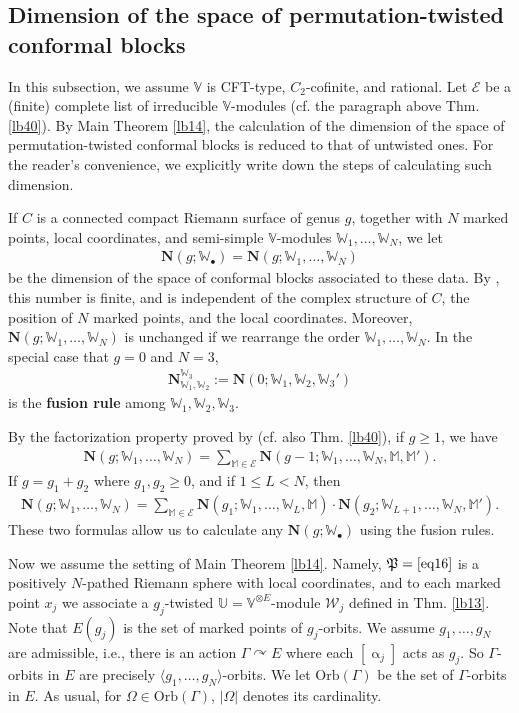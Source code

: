 \documentclass[12pt,a4paper,notitlepage]{article}
\theoremstyle{definition}
\theoremstyle{plain}
\newcommand{\fk}{\mathfrak}
\newcommand{\mc}{\mathcal}
\newcommand{\bk}[1]{\langle {#1}\rangle}
\newcommand{\blt}{\bullet}
\newcommand{\Vbb}{\mathbb V}
\newcommand{\Ubb}{\mathbb U}
\newcommand{\Wbb}{\mathbb W}
\newcommand{\Mbb}{\mathbb M}
\newcommand{\Nbf}{\mathbf N}
\newcommand{\Orb}{\mathrm{Orb}}
\numberwithin{equation}{subsection}
\begin{document}
\begin{subappendices}
\subsection{Dimension of the space of permutation-twisted conformal blocks}\label{lb58}

In this subsection, we assume $\Vbb$ is CFT-type, $C_2$-cofinite, and rational. Let $\mc E$ be a (finite) complete list of irreducible $\Vbb$-modules (cf. the paragraph above Thm. \ref{lb40}). By Main Theorem \ref{lb14}, the calculation of the dimension of the space of permutation-twisted conformal blocks is reduced to that of untwisted ones. For the reader's convenience, we explicitly write down the steps of calculating such dimension.



If $C$ is a connected compact Riemann surface of genus $g$, together with $N$ marked points, local coordinates, and semi-simple  $\Vbb$-modules $\Wbb_1,\dots,\Wbb_N$, we let
\begin{align*}
\Nbf(g;\Wbb_\blt)=\Nbf(g;\Wbb_1,\dots,\Wbb_N)	 
\end{align*}
be the dimension of the space of conformal blocks associated to these data. By \cite{DGT19a,DGT19b}, this number is finite, and  is independent of the complex structure of $C$, the position of $N$ marked points, and the local coordinates. Moreover, $\Nbf(g;\Wbb_1,\dots,\Wbb_N)$ is unchanged if we rearrange the order $\Wbb_1,\dots,\Wbb_N$. In the special case that $g=0$ and $N=3$,
\begin{align*}
\Nbf_{\Wbb_1,\Wbb_2}^{\Wbb_3}:=\Nbf(0;\Wbb_1,\Wbb_2,\Wbb_3')	
\end{align*}
is the \textbf{fusion rule} among $\Wbb_1,\Wbb_2,\Wbb_3$.

By the factorization property proved by \cite{DGT19b} (cf. also Thm. \ref{lb40}), if $g\geq 1$, we have
\begin{align}
\Nbf(g;\Wbb_1,\dots,\Wbb_N)=\sum_{\Mbb\in\mc E}\Nbf(g-1;\Wbb_1,\dots,\Wbb_N,\Mbb,\Mbb').	
\end{align}
If $g=g_1+g_2$ where $g_1,g_2\geq 0$, and if $1\leq L<N$, then
\begin{align}
\Nbf(g;\Wbb_1,\dots,\Wbb_N)=\sum_{\Mbb\in\mc E}\Nbf(g_1;\Wbb_1,\dots,\Wbb_L,\Mbb)\cdot\Nbf(g_2;\Wbb_{L+1},\dots,\Wbb_N,\Mbb').	
\end{align}	
These two formulas allow us to calculate any $\Nbf(g;\Wbb_\blt)$ using the fusion rules.


Now we assume the setting of Main Theorem \ref{lb14}. Namely, $\fk P=\eqref{eq16}$ is a positively  $N$-pathed Riemann sphere with local coordinates, and to each marked point $x_j$ we associate a $g_j$-twisted  $\Ubb=\Vbb^{\otimes E}$-module $\mc W_j$ defined in Thm. \ref{lb13}. Note that $E(g_j)$ is the set of marked points of $g_j$-orbits. We assume $g_1,\dots,g_N$ are admissible, i.e., there is an action $\Gamma\curvearrowright E$ where each $[\upalpha_j]$ acts as $g_j$. So $\Gamma$-orbits in $E$ are precisely $\bk{g_1,\dots,g_N}$-orbits. We let $\Orb(\Gamma)$ be the set of $\Gamma$-orbits in $E$. As usual, for $\Omega\in\Orb(\Gamma)$, $|\Omega|$ denotes its cardinality.




\end{subappendices}
\end{document}
